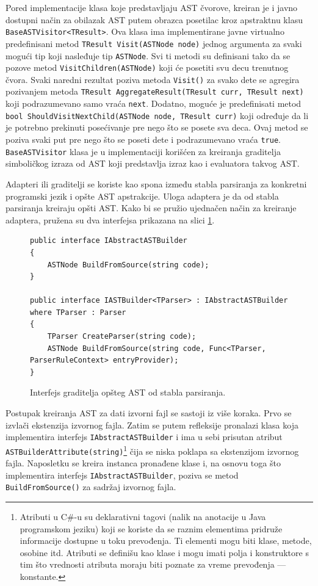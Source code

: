 Pored implementacije klasa koje predstavljaju AST čvorove, kreiran je i javno dostupni način za obilazak AST putem obrazca posetilac kroz apstraktnu klasu \texttt{BaseASTVisitor<TResult>}. Ova klasa ima implementirane javne virtualno predefinisani metod \texttt{TResult Visit(ASTNode node)} jednog argumenta za svaki mogući tip koji nasleđuje tip \texttt{ASTNode}. Svi ti metodi su definisani tako da se pozove metod \texttt{VisitChildren(ASTNode)} koji će posetiti svu decu trenutnog čvora. Svaki naredni rezultat poziva metoda \texttt{Visit()} za svako dete se agregira pozivanjem metoda \texttt{TResult AggregateResult(TResult curr, TResult next)} koji podrazumevano samo vraća \texttt{next}. Dodatno, moguće je predefinisati metod \texttt{bool ShouldVisitNextChild(ASTNode node, TResult curr)} koji određuje da li je potrebno prekinuti posećivanje pre nego što se posete sva deca. Ovaj metod se poziva svaki put pre nego što se poseti dete i podrazumevano vraća \texttt{true}. \texttt{BaseASTVisitor} klasa je u implementaciji korišćen za kreiranja graditelja simboličkog izraza od AST koji predstavlja izraz kao i evaluatora takvog AST. 

Adapteri ili graditelji se koriste kao spona između stabla parsiranja za konkretni programski jezik i opšte AST apstrakcije. Uloga adaptera je da od stabla parsiranja kreiraju opšti AST. Kako bi se pružio ujednačen način za kreiranje adaptera, pružena su dva interfejsa prikazana na slici \ref{fig:ImplBuilderInterface}.

\begin{figure}[h!]
\centering
\begin{lstlisting}
public interface IAbstractASTBuilder
{
    ASTNode BuildFromSource(string code);
}

public interface IASTBuilder<TParser> : IAbstractASTBuilder where TParser : Parser
{
    TParser CreateParser(string code);
    ASTNode BuildFromSource(string code, Func<TParser, ParserRuleContext> entryProvider);
}
\end{lstlisting}
\caption{Interfejs graditelja opšteg AST od stabla parsiranja.}
\label{fig:ImplBuilderInterface}
\end{figure}

Postupak kreiranja AST za dati izvorni fajl se sastoji iz više koraka. Prvo se izvlači ekstenzija izvornog fajla. Zatim se putem refleksije pronalazi klasa koja implementira interfejs \texttt{IAbstractASTBuilder} i ima u sebi prisutan atribut \texttt{ASTBuilderAttribute(string)}\footnote{Atributi u C\#-u su deklarativni tagovi (nalik na anotacije u Java programskom jeziku) koji se koriste da se raznim elementima pridruže informacije dostupne u toku prevođenja. Ti elementi mogu biti klase, metode, osobine itd. Atributi se definišu kao klase i mogu imati polja i konstruktore s tim što vrednosti atributa moraju biti poznate za vreme prevođenja --- konstante.}
čija se niska poklapa sa ekstenzijom izvornog fajla. Naposletku se kreira instanca pronađene klase i, na osnovu toga što implementira interfejs \texttt{IAbstractASTBuilder}, poziva se metod \texttt{BuildFromSource()} za sadržaj izvornog fajla.

